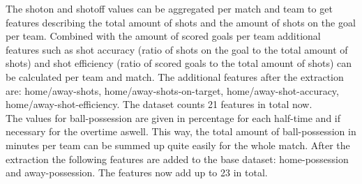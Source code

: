 The shoton and shotoff values can be aggregated per match and team to get features describing the total amount of shots and the amount of shots on the goal per team. Combined with the amount of scored goals per team additional features such as shot accuracy (ratio of shots on the goal to the total amount of shots) and shot efficiency (ratio of scored goals to the total amount of shots) can be calculated per team and match.
\newline
The additional features after the extraction are: home/away-shots, home/away-shots-on-target, home/away-shot-accuracy, home/away-shot-efficiency. The dataset counts 21 features in total now.
\\
The values for ball-possession are given in percentage for each half-time and if necessary for the overtime aswell. This way, the total amount of ball-possession in minutes per team can be summed up quite easily for the whole match.
\newline
After the extraction the following features are added to the base dataset: home-possession and away-possession. The features now add up to 23 in total.
